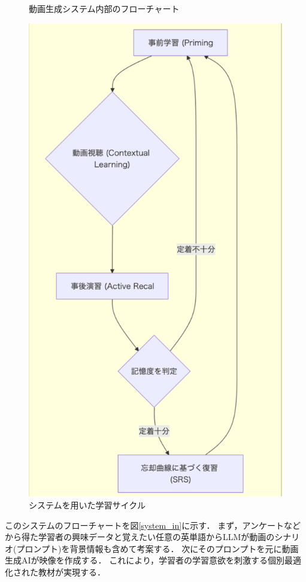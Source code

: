 \documentclass[titlepage,a4paper]{jsarticle}
\begin{document}
\begin{figure}[H]
\begin{minipage}[t]{0.2\textwidth}
        \caption{動画生成システム内部のフローチャート}
        \label{system_in}
    \end{minipage}
    \hfill %
    \begin{minipage}[t]{0.2\textwidth}
        \centering
        \includegraphics[width=\textwidth]{img/sysout.png}
        \caption{システムを用いた学習サイクル}
        \label{system_out}
    \end{minipage}
\end{figure}
このシステムのフローチャートを図\ref{system_in}に示す．
まず，アンケートなどから得た学習者の興味データと覚えたい任意の英単語からLLMが動画のシナリオ(プロンプト)を背景情報も含めて考案する．
次にそのプロンプトを元に動画生成AIが映像を作成する．
これにより，学習者の学習意欲を刺激する個別最適化された教材が実現する．
\end{document}
